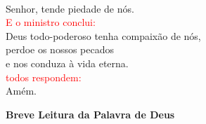\documentclass{book}
\begin{document}
\begin{flushleft}
    \vspace{.1cm} \\
    Senhor, tende piedade de nós.
    \vspace{.1cm} \\
    \textcolor{red}{E o ministro conclui:}
    \vspace{.1cm} \\
    Deus todo-poderoso tenha compaixão de nós, \\
    perdoe os nossos pecados \\
    e nos conduza à vida eterna.
    \vspace{.1cm} \\
    \textcolor{red}{todos respondem:}
    \vspace{.1cm} \\
    Amém.
\end{flushleft}
\begin{center}
    \textbf{Breve Leitura da Palavra de Deus}
\end{center}
\end{document}

